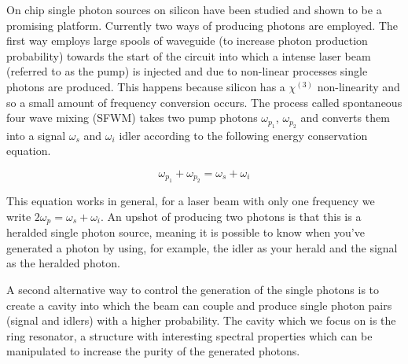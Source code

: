 On chip single photon sources on silicon have been studied \cite{silverstone_-chip_2014,engin_photon_2013} and shown to be a promising platform. Currently two ways of producing photons are employed. The first way employs large spools of waveguide (to increase photon production probability) towards the start of the circuit into which a intense laser beam (referred to as the pump) is injected and due to non-linear processes single photons are produced. This happens because silicon has a $\chi^{(3)}$ non-linearity and so a small amount of frequency conversion occurs. The process called spontaneous four wave mixing (SFWM) takes two pump photons $\omega_{p_1}$, $\omega_{p_2}$ and converts them into a signal $\omega_s$ and  $\omega_i$ idler according to the following energy conservation equation.

\begin{equation} \label{energyConservation}
\omega_{p_1}+\omega_{p_2}=\omega_s+\omega_i
\end{equation}

This equation works in general, for a laser beam with only one frequency we write $2\omega_p=\omega_s+\omega_i$. An upshot of producing two photons is that this is a heralded single photon source, meaning it is possible to know when you've generated a photon by using, for example, the idler as your herald and the signal as the heralded photon. 

A second alternative way to control the generation of the single photons is to create a cavity into which the beam can couple and produce single photon pairs (signal and idlers) with a higher probability. The cavity which we focus on is the ring resonator, a structure with interesting spectral properties which can be manipulated to increase the purity of the generated photons. 




